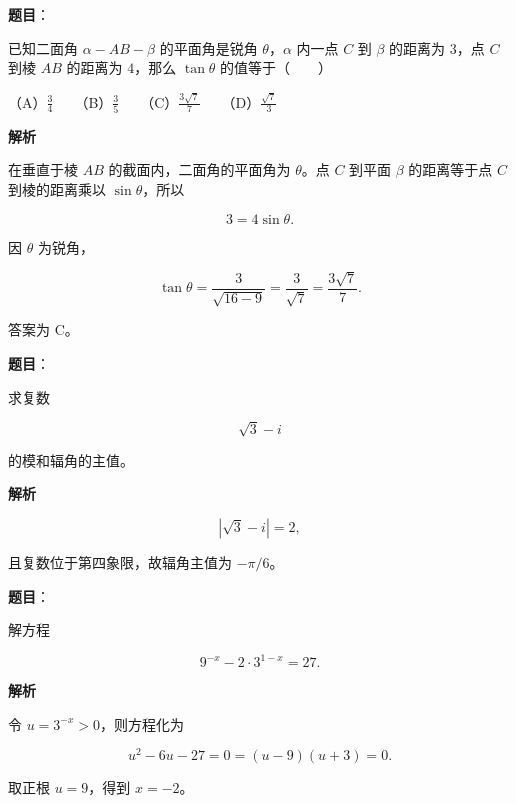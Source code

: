 \begin{answer}

\textbf{题目}：

已知二面角 $\alpha-AB-\beta$ 的平面角是锐角 $\theta$，$\alpha$ 内一点 $C$ 到 $\beta$ 的距离为 $3$，点 $C$ 到棱 $AB$ 的距离为 $4$，那么 $\tan\theta$ 的值等于\mbox{（　　）}

（A）$\frac34$　　（B）$\frac35$　　（C）$\frac{3\sqrt7}{7}$　　（D）$\frac{\sqrt7}{3}$

\textbf{解析}

在垂直于棱 $AB$ 的截面内，二面角的平面角为 $\theta$。点 $C$ 到平面 $\beta$ 的距离等于点 $C$ 到棱的距离乘以 $\sin\theta$，所以

\nopagebreak[4]
\[
3=4\sin\theta.
\]

因 $\theta$ 为锐角，

\nopagebreak[4]
\[
\tan\theta=\frac{3}{\sqrt{16-9}}=\frac3{\sqrt7}
=\frac{3\sqrt7}{7}.
\]

答案为 C。


\end{answer}
\begin{answer}

\textbf{题目}：

求复数

\nopagebreak[4]
\[
\sqrt3-i
\]

的模和辐角的主值。

\textbf{解析}

\nopagebreak[4]
\[
|\sqrt3-i|=2,
\]

且复数位于第四象限，故辐角主值为 $-\pi/6$。


\end{answer}
\begin{answer}

\textbf{题目}：

解方程

\nopagebreak[4]
\[
9^{-x}-2\cdot3^{1-x}=27.
\]

\textbf{解析}

令 $u=3^{-x}>0$，则方程化为

\nopagebreak[4]
\[
u^2-6u-27=0
= (u-9)(u+3)=0.
\]

取正根 $u=9$，得到 $x=-2$。


\end{answer}
